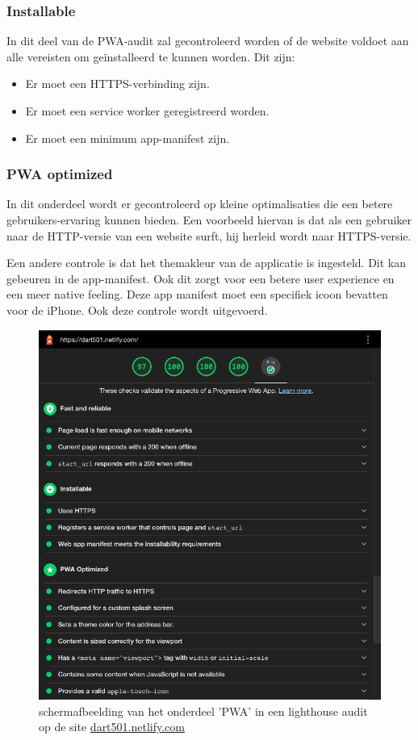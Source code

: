 	
	\subsubsection{Installable}
	
		In dit deel van de PWA-audit zal gecontroleerd worden of de website voldoet aan alle vereisten om geïnstalleerd te kunnen worden. Dit zijn:
		\begin{itemize}
			\item	Er moet een HTTPS-verbinding zijn.
			\item	Er moet een service worker geregistreerd worden.
			\item	Er moet een minimum app-manifest zijn.
		\end{itemize}
		\autocite{web.dev2020a}
		
	
	\subsubsection{PWA optimized}
	
		In dit onderdeel wordt er gecontroleerd op kleine optimalisaties die een betere gebruikers-ervaring kunnen bieden. 
		Een voorbeeld hiervan is dat als een gebruiker naar de HTTP-versie van een website surft, hij herleid wordt naar HTTPS-versie.
		
		Een andere controle is dat het themakleur van de applicatie is ingesteld. Dit kan gebeuren in de app-manifest. Ook dit zorgt voor een betere user experience en een meer native feeling. Deze app manifest moet een specifiek icoon bevatten voor de iPhone. Ook deze controle wordt uitgevoerd.
		
		
		\begin{figure}[H]
			\centering
			\includegraphics{./img/lighthouse.png}
			\caption{schermafbeelding van het onderdeel 'PWA' in een lighthouse audit op de site \href{ https://dart501.netlify.com}{dart501.netlify.com} }
			\label{fig:lighthouseDarts}
		\end{figure}
		
